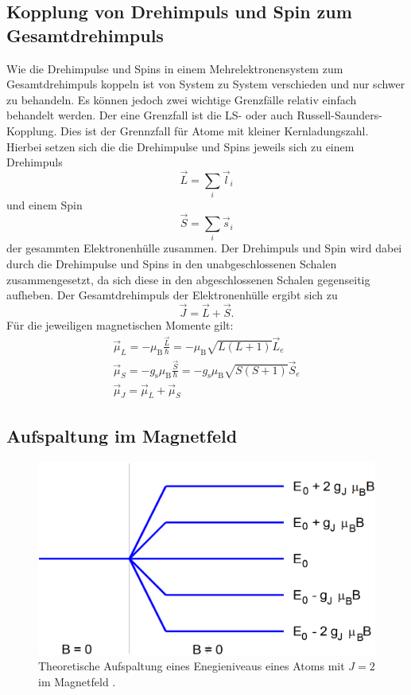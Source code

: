 \subsection{Kopplung von Drehimpuls und Spin zum Gesamtdrehimpuls}

Wie die Drehimpulse und Spins in einem Mehrelektronensystem zum Gesamtdrehimpuls koppeln ist von System zu System verschieden und nur schwer zu behandeln. Es können jedoch zwei wichtige Grenzfälle relativ einfach behandelt werden. Der eine Grenzfall ist die LS- oder auch Russell-Saunders-Kopplung. Dies ist der Grennzfall für Atome mit kleiner Kernladungszahl. Hierbei setzen sich die die Drehimpulse und Spins jeweils sich zu einem Drehimpuls \[\vec{L}=\sum_i \vec{l}_i\] und einem Spin \[\vec{S}=\sum_i \vec{s}_i\] der gesammten Elektronenhülle zusammen. Der Drehimpuls und Spin wird dabei durch die Drehimpulse und Spins in den unabgeschlossenen Schalen zusammengesetzt, da sich diese in den abgeschlossenen Schalen gegenseitig aufheben. Der Gesamtdrehimpuls der Elektronenhülle ergibt sich zu \[\vec{J}=\vec{L}+\vec{S}.\] Für die jeweiligen magnetischen Momente gilt:
\begin{gather*}
	\vec{\mu}_L=-  \mu_\text{B} \frac{\vec{L}}{\hbar}=- \mu_\text{B} \sqrt{L(L+1)} \vec{L}_e\\
	\vec{\mu}_S=- g_\text{s} \mu_\text{B} \frac{\vec{S}}{\hbar}=- g_\text{s} \mu_\text{B} \sqrt{S(S+1)} \vec{S}_e\\
	\vec{\mu}_J=\vec{\mu}_L+\vec{\mu}_S
\end{gather*}



\subsection{Aufspaltung im Magnetfeld}
\begin{figure}
	\centering
	\includegraphics[width=\linewidth-250pt,height=\textheight-250pt,keepaspectratio]{content/Images/generelleAufspaltung.png}
    \caption{Theoretische Aufspaltung eines Enegieniveaus eines Atoms mit $J=2$ im Magnetfeld \cite{V27}.}
    \label{fig:aborb}
\end{figure}

